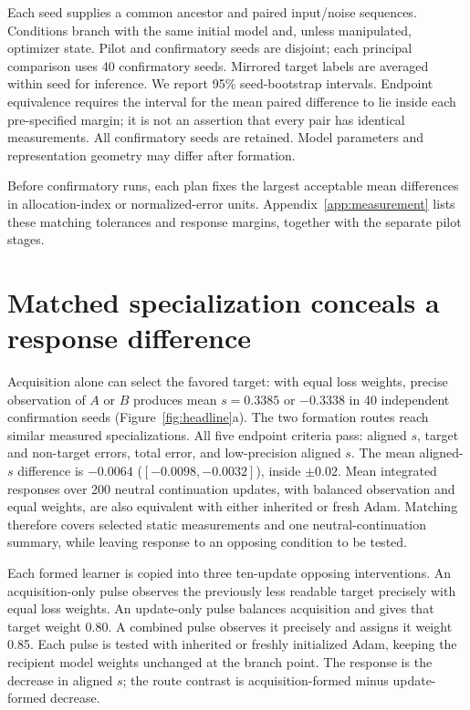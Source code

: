 Each seed supplies a common ancestor and paired input/noise sequences. Conditions branch with the same initial model and, unless manipulated, optimizer state. Pilot and confirmatory seeds are disjoint; each principal comparison uses 40 confirmatory seeds. Mirrored target labels are averaged within seed for inference. We report 95\% seed-bootstrap intervals. Endpoint equivalence requires the interval for the mean paired difference to lie inside each pre-specified margin; it is not an assertion that every pair has identical measurements. All confirmatory seeds are retained. Model parameters and representation geometry may differ after formation.

Before confirmatory runs, each plan fixes the largest acceptable mean differences in allocation-index or normalized-error units. Appendix~\ref{app:measurement} lists these matching tolerances and response margins, together with the separate pilot stages.


\section{Matched specialization conceals a response difference}
\label{sec:latent}
Acquisition alone can select the favored target: with equal loss weights, precise observation of $A$ or $B$ produces mean $s=0.3385$ or $-0.3338$ in 40 independent confirmation seeds (Figure~\ref{fig:headline}a). The two formation routes reach similar measured specializations. All five endpoint criteria pass: aligned $s$, target and non-target errors, total error, and low-precision aligned $s$. The mean aligned-$s$ difference is $-0.0064$ ($[-0.0098,-0.0032]$), inside $\pm0.02$. Mean integrated responses over 200 neutral continuation updates, with balanced observation and equal weights, are also equivalent with either inherited or fresh Adam. Matching therefore covers selected static measurements and one neutral-continuation summary, while leaving response to an opposing condition to be tested.

Each formed learner is copied into three ten-update opposing interventions. An acquisition-only pulse observes the previously less readable target precisely with equal loss weights. An update-only pulse balances acquisition and gives that target weight 0.80. A combined pulse observes it precisely and assigns it weight 0.85. Each pulse is tested with inherited or freshly initialized Adam, keeping the recipient model weights unchanged at the branch point. The response is the decrease in aligned $s$; the route contrast is acquisition-formed minus update-formed decrease.

